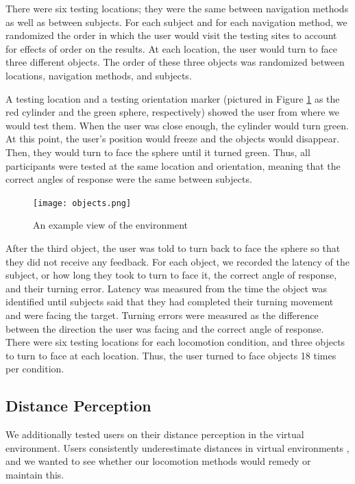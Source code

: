 \documentclass[titlepage]{article}
\theoremstyle{definition}
\theoremstyle{proof}
\begin{document}
There were six testing locations;
they were the same between navigation methods as well as between subjects.
For each subject and for each navigation method, we randomized the order in which
the user would visit the testing sites to account for effects of order on the results.
At each location, the user would turn to face three different objects.
The order of these three objects was randomized between locations, navigation methods, and subjects.

A testing location and a testing orientation marker
(pictured in Figure \ref{fig:objects} as the red cylinder and the green sphere, respectively)
showed the user from where we would test them.
When the user was close enough,
the cylinder would turn green.
At this point, the user's position would freeze and the objects would disappear.
Then, they would turn to face the sphere until it turned green.
Thus, all participants were tested at the same location and orientation,
meaning that the correct angles of response were the same between subjects.

\begin{figure}[h]
  \centering
  \texttt{[image: objects.png]}
  \caption{An example view of the environment}
  \label{fig:objects}
\end{figure}

After the third object, the user was told to turn back to face the sphere
so that they did not receive any feedback.
For each object, we recorded the latency of the subject, or how long they took to turn to face it,
the correct angle of response,
and their turning error.
Latency was measured from the time the object was identified
until subjects said that they had completed their turning movement and were facing the target.
Turning errors were measured as the difference between the direction the user was facing
and the correct angle of response.
There were six testing locations for each locomotion condition, and three objects to turn to face at each location.
Thus, the user turned to face objects 18 times per condition.

\subsection{Distance Perception}
We additionally tested users on their distance perception in the virtual environment.
Users consistently underestimate distances in virtual environments
\cite{Plumert:2005:DPR:1077399.1077402,Renner:2013:PED:2543581.2543590},
and we wanted to see whether our locomotion methods would remedy or maintain this.
\end{document}
